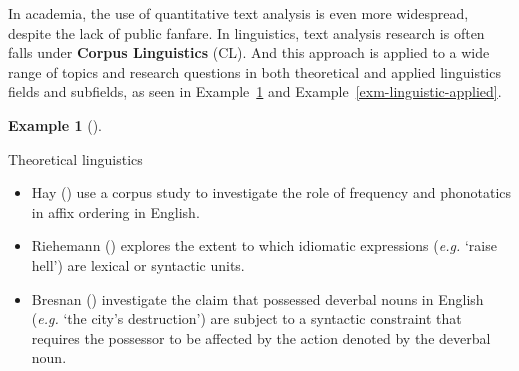 \documentclass[
  letterpaper,
]{latex/krantz}
\providecommand{\tightlist}{%
  \setlength{\itemsep}{0pt}\setlength{\parskip}{0pt}}\usepackage{longtable,booktabs,array}
\theoremstyle{definition}
\newtheorem{example}{Example}[chapter]
\theoremstyle{remark}
\begin{document}
In academia, the use of quantitative text analysis is even more
widespread, despite the lack of public fanfare. In linguistics, text
analysis research is often falls under
\textbf{Corpus Linguistics} (CL). And this
approach is applied to a wide range of topics and research questions in
both theoretical and applied linguistics fields and subfields, as seen
in Example~\ref{exm-linguistic-theory} and
Example~\ref{exm-linguistic-applied}.

\begin{example}[]\protect\hypertarget{exm-linguistic-theory}{}\label{exm-linguistic-theory}

Theoretical linguistics

\begin{itemize}
\tightlist
\item
  Hay () use a corpus study to investigate
  the role of frequency and phonotatics in affix ordering in English.
\item
  Riehemann () explores the extent to
  which idiomatic expressions (\emph{e.g.} `raise hell') are lexical or
  syntactic units.
\item
  Bresnan () investigate the claim that
  possessed deverbal nouns in English (\emph{e.g.} `the city's
  destruction') are subject to a syntactic constraint that requires the
  possessor to be affected by the action denoted by the deverbal noun.
\end{itemize}

\end{example}
\end{document}
